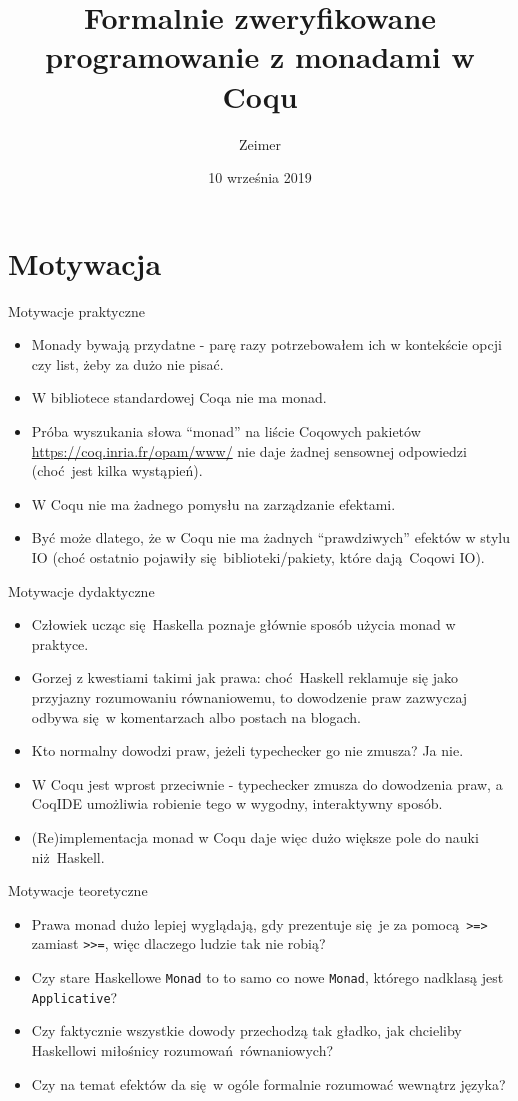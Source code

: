 \documentclass{beamer}
\title{Formalnie zweryfikowane programowanie z monadami w Coqu}
\author{Zeimer}
\date{10 września 2019}
\begin{document}
\frame{\titlepage}

\frame{\tableofcontents}

\section{Motywacja}

\begin{frame}{Motywacje praktyczne}
\begin{itemize}
	\item Monady bywają przydatne - parę razy potrzebowałem ich w kontekście opcji czy list, żeby za dużo nie pisać.
	\item W bibliotece standardowej Coqa nie ma monad.
	\item Próba wyszukania słowa ``monad'' na liście Coqowych pakietów \url{https://coq.inria.fr/opam/www/} nie daje żadnej sensownej odpowiedzi (choć jest kilka wystąpień).
	\item W Coqu nie ma żadnego pomysłu na zarządzanie efektami.
	\item Być może dlatego, że w Coqu nie ma żadnych ``prawdziwych'' efektów w stylu IO (choć ostatnio pojawiły się biblioteki/pakiety, które dają Coqowi IO).
\end{itemize}
\end{frame}

\begin{frame}{Motywacje dydaktyczne}
\begin{itemize}
	\item Człowiek ucząc się Haskella poznaje głównie sposób użycia monad w praktyce.
	\item Gorzej z kwestiami takimi jak prawa: choć Haskell reklamuje się jako przyjazny rozumowaniu równaniowemu, to dowodzenie praw zazwyczaj odbywa się w komentarzach albo postach na blogach.
	\item Kto normalny dowodzi praw, jeżeli typechecker go nie zmusza? Ja nie.
	\item W Coqu jest wprost przeciwnie - typechecker zmusza do dowodzenia praw, a CoqIDE umożliwia robienie tego w wygodny, interaktywny sposób.
	\item (Re)implementacja monad w Coqu daje więc dużo większe pole do nauki niż Haskell.
\end{itemize}
\end{frame}

\begin{frame}{Motywacje teoretyczne}
\begin{itemize}
	\item Prawa monad dużo lepiej wyglądają, gdy prezentuje się je za pomocą \texttt{>=>} zamiast \texttt{>>=}, więc dlaczego ludzie tak nie robią?
	\item Czy stare Haskellowe \texttt{Monad} to to samo co nowe \texttt{Monad}, którego nadklasą jest \texttt{Applicative}?
	\item Czy faktycznie wszystkie dowody przechodzą tak gładko, jak chcieliby Haskellowi miłośnicy rozumowań równaniowych?
	\item Czy na temat efektów da się w ogóle formalnie rozumować wewnątrz języka?
\end{itemize}
\end{frame}
\end{document}
